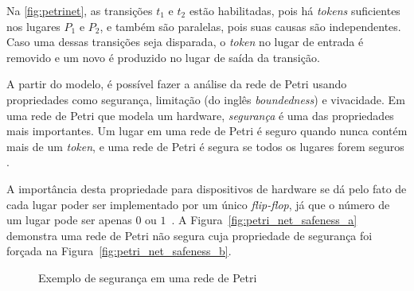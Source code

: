 Na \autoref{fig:petrinet}, as transições $t_1$ e $t_2$ estão habilitadas, pois há \textit{tokens} suficientes nos lugares $P_1$ e $P_2$, e também são paralelas, pois suas causas são independentes. Caso uma dessas transições seja disparada, o \textit{token} no lugar de entrada é removido e um novo é produzido no lugar de saída da transição.

A partir do modelo, é possível fazer a análise da rede de Petri usando propriedades como segurança, limitação (do inglês \textit{boundedness}) e vivacidade. Em uma rede de Petri que modela um hardware, \textit{segurança} é uma das propriedades mais importantes. Um lugar em uma rede de Petri é seguro quando nunca contém mais de um \textit{token}, e uma rede de Petri é segura se todos os lugares forem seguros \cite{peterson:1981}.

A importância desta propriedade para dispositivos de hardware se dá pelo fato de cada lugar poder ser implementado por um único \textit{flip-flop}, já que o número de um lugar pode ser apenas $0$ ou $1$~\cite{peterson:1981}. A Figura~\ref{fig:petri_net_safeness_a} demonstra uma rede de Petri não segura cuja propriedade de segurança foi forçada na Figura~\ref{fig:petri_net_safeness_b}.

\begin{figure}[ht]
    \centering
    \caption{Exemplo de segurança em uma rede de Petri}
    \label{fig:petri_net_safeness}
        \hspace{0.1cm}
\end{figure}

